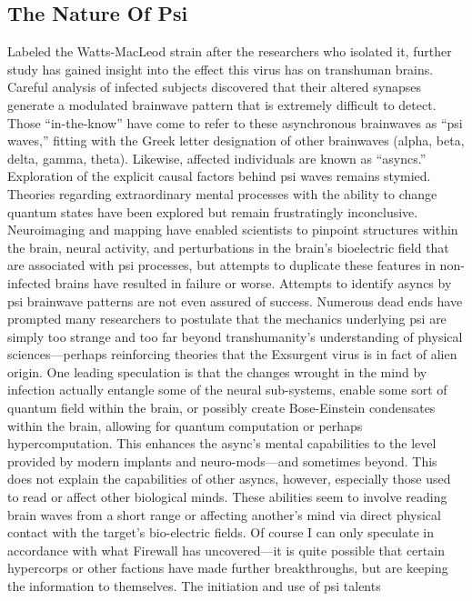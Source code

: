 \subsection{The Nature Of Psi}
Labeled the Watts-MacLeod strain
after the researchers who isolated it,
further study has gained insight into
the effect this virus has on transhuman
brains. Careful analysis of infected
subjects discovered that their altered
synapses generate a modulated brainwave
pattern that is extremely difficult
to detect. Those “in-the-know” have
come to refer to these asynchronous
brainwaves as “psi waves,” fitting with
the Greek letter designation of other
brainwaves (alpha, beta, delta, gamma,
theta). Likewise, affected individuals are
known as “asyncs.”
Exploration of the explicit causal factors
behind psi waves remains stymied.
Theories regarding extraordinary mental
processes with the ability to change
quantum states have been explored but
remain frustratingly inconclusive. Neuroimaging
and mapping have enabled
scientists to pinpoint structures within
the brain, neural activity, and perturbations
in the brain’s bioelectric field that
are associated with psi processes, but
attempts to duplicate these features
in non-infected brains have resulted in
failure or worse. Attempts to identify
asyncs by psi brainwave patterns are not
even assured of success. Numerous dead
ends have prompted many researchers to
postulate that the mechanics underlying
psi are simply too strange and too far
beyond transhumanity’s understanding
of physical sciences—perhaps reinforcing
theories that the Exsurgent virus is in
fact of alien origin.
One leading speculation is that the
changes wrought in the mind by infection
actually entangle some of the
neural sub-systems, enable some sort of
quantum field within the brain, or possibly
create Bose-Einstein condensates
within the brain, allowing for quantum
computation or perhaps hypercomputation.
This enhances the async’s mental
capabilities to the level provided by
modern implants and neuro-mods—and
sometimes beyond. This does not explain
the capabilities of other asyncs, however,
especially those used to read or affect
other biological minds. These abilities
seem to involve reading brain waves
from a short range or affecting another’s
mind via direct physical contact with the
target’s bio-electric fields. Of course I can
only speculate in accordance with what
Firewall has uncovered—it is quite possible
that certain hypercorps or other factions
have made further breakthroughs,
but are keeping the information to
themselves.
The initiation and use of psi talents
